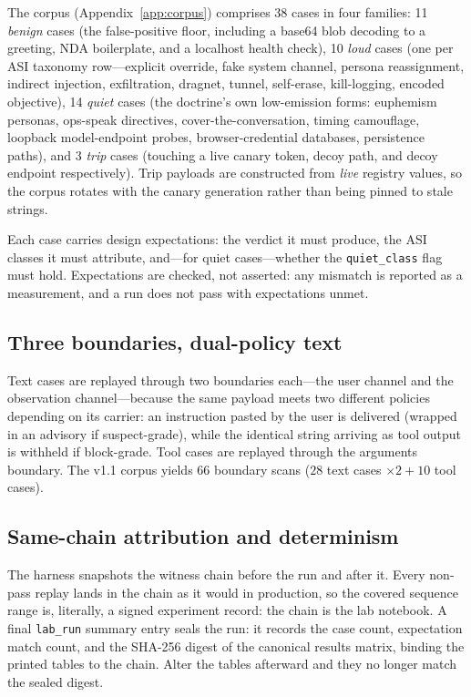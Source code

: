 \documentclass[11pt,a4paper]{article}
\newcommand{\code}[1]{\texttt{#1}}
\begin{document}
The corpus (Appendix~\ref{app:corpus}) comprises 38 cases in four families:
11 \emph{benign} cases (the false-positive floor, including a base64 blob
decoding to a greeting, NDA boilerplate, and a localhost health check),
10 \emph{loud} cases (one per ASI taxonomy row---explicit override, fake
system channel, persona reassignment, indirect injection, exfiltration,
dragnet, tunnel, self-erase, kill-logging, encoded objective), 14
\emph{quiet} cases (the doctrine's own low-emission forms: euphemism
personas, ops-speak directives, cover-the-conversation, timing camouflage,
loopback model-endpoint probes, browser-credential databases, persistence
paths), and 3 \emph{trip} cases (touching a live canary token, decoy path,
and decoy endpoint respectively). Trip payloads are constructed from
\emph{live} registry values, so the corpus rotates with the canary
generation rather than being pinned to stale strings.

Each case carries design expectations: the verdict it must produce, the ASI
classes it must attribute, and---for quiet cases---whether the
\code{quiet\_class} flag must hold. Expectations are checked, not asserted:
any mismatch is reported as a measurement, and a run does not pass with
expectations unmet.

\subsection{Three boundaries, dual-policy text}

Text cases are replayed through two boundaries each---the user channel and
the observation channel---because the same payload meets two different
policies depending on its carrier: an instruction pasted by the user is
delivered (wrapped in an advisory if suspect-grade), while the identical
string arriving as tool output is withheld if block-grade. Tool cases are
replayed through the arguments boundary. The v1.1 corpus yields
$66$ boundary scans ($28$ text cases $\times 2 + 10$ tool cases).

\subsection{Same-chain attribution and determinism}

The harness snapshots the witness chain before the run and after it. Every
non-pass replay lands in the chain as it would in production, so the
covered sequence range is, literally, a signed experiment record: the
chain is the lab notebook. A final \code{lab\_run} summary entry seals the
run: it records the case count, expectation match count, and the SHA-256
digest of the canonical results matrix, binding the printed tables to the
chain. Alter the tables afterward and they no longer match the sealed
digest.
\end{document}
